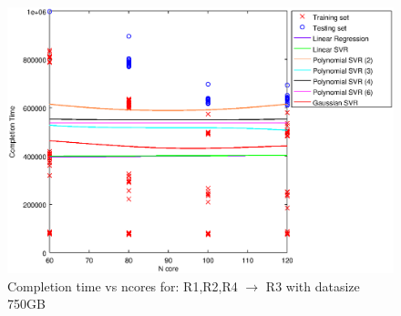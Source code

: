 
\begin {figure}[hbtp]
\centering
\includegraphics[width=\textwidth]{output/R1,R2,R4_R3_750_ALL_FEATURES/plot_R1,R2,R4_R3_750.eps}
\caption{Completion time vs ncores for: R1,R2,R4 $\rightarrow$ R3 with datasize 750GB}
\label{fig:coreonly_linear_R1,R2,R4_R3_750}
\end {figure}
